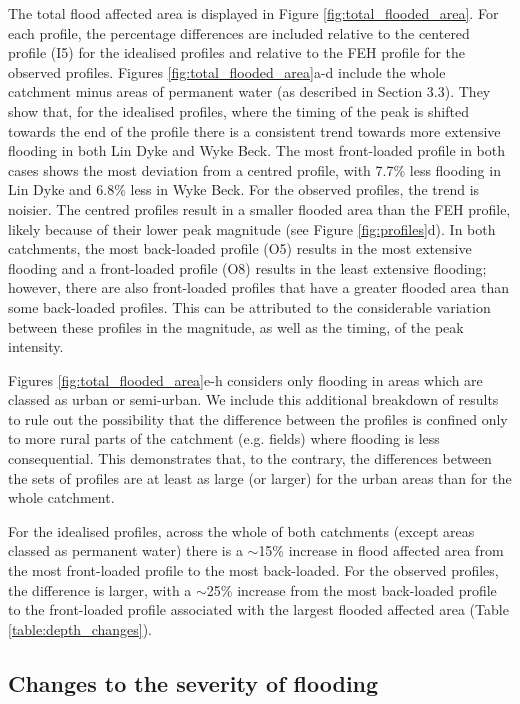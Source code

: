 \documentclass[APA,Times2COL]{WileyNJDv5}
\begin{document}
The total flood affected area is displayed in Figure \ref{fig:total_flooded_area}. For each profile, the percentage differences are included relative to the centered profile (I5) for the idealised profiles and relative to the FEH profile for the observed profiles. Figures \ref{fig:total_flooded_area}a-d include the whole catchment minus areas of permanent water (as described in Section 3.3). They show that, for the idealised profiles, where the timing of the peak is shifted towards the end of the profile there is a consistent trend towards more extensive flooding in both Lin Dyke and Wyke Beck. The most front-loaded profile in both cases shows the most deviation from a centred profile, with 7.7\% less flooding in Lin Dyke and 6.8\% less in Wyke Beck. For the observed profiles, the trend is noisier. The centred profiles result in a smaller flooded area than the FEH profile, likely because of their lower peak magnitude (see Figure \ref{fig:profiles}d). In both catchments, the most back-loaded profile (O5) results in the most extensive flooding and a front-loaded profile (O8) results in the least extensive flooding; however, there are also front-loaded profiles that have a greater flooded area than some back-loaded profiles. This can be attributed to the considerable variation between these profiles in the magnitude, as well as the timing, of the peak intensity. 

Figures \ref{fig:total_flooded_area}e-h considers only flooding in areas which are classed as urban or semi-urban. We include this additional breakdown of results to rule out the possibility that the difference between the profiles is confined only to more rural parts of the catchment (e.g. fields) where flooding is less consequential. This demonstrates that, to the contrary, the differences between the sets of profiles are at least as large (or larger) for the urban areas than for the whole catchment. 

For the idealised profiles, across the whole of both catchments (except areas classed as permanent water) there is a $\sim$15\% increase in flood affected area from the most front-loaded profile to the most back-loaded. For the observed profiles, the difference is larger, with a $\sim$25\% increase from the most back-loaded profile to the front-loaded profile associated with the largest flooded affected area (Table \ref{table:depth_changes}). 

\subsection{Changes to the severity of flooding}\label{subsec:model}
\end{document}
